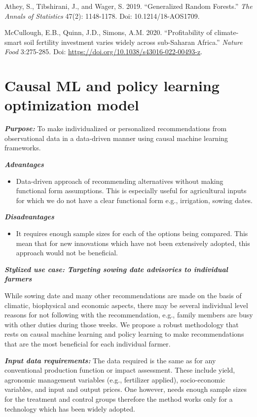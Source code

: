 \documentclass[
  letterpaper,
  DIV=11,
  numbers=noendperiod]{scrreprt}
\providecommand{\tightlist}{%
  \setlength{\itemsep}{0pt}\setlength{\parskip}{0pt}}\usepackage{longtable,booktabs,array}
\begin{document}
Athey, S., Tibshirani, J., and Wager, S. 2019. ``Generalized Random
Forests.'' \emph{The Annals of Statistics} 47(2): 1148-1178. Doi:
10.1214/18-AOS1709.

McCullough, E.B., Quinn, J.D., Simons, A.M. 2020. ``Profitability of
climate-smart soil fertility investment varies widely across sub-Saharan
Africa.'' \emph{Nature Food} 3:275-285. Doi:
\url{https://doi.org/10.1038/s43016-022-00493-z}.

\section{Causal ML and policy learning optimization
model}\label{causal-ml-and-policy-learning-optimization-model}

\textbf{\emph{Purpose:}} To make individualized or personalized
recommendations from observational data in a data-driven manner using
causal machine learning frameworks.

\textbf{\emph{Advantages}}

\begin{itemize}
\tightlist
\item
  Data-driven approach of recommending alternatives without making
  functional form assumptions. This is especially useful for
  agricultural inputs for which we do not have a clear functional form
  e.g., irrigation, sowing dates.
\end{itemize}

\textbf{\emph{Disadvantages}}

\begin{itemize}
\tightlist
\item
  It requires enough sample sizes for each of the options being
  compared. This mean that for new innovations which have not been
  extensively adopted, this approach would not be beneficial.
\end{itemize}

\textbf{\emph{Stylized use case: Targeting sowing date advisories to
individual farmers}}

While sowing date and many other recommendations are made on the basis
of climatic, biophysical and economic aspects, there may be several
individual level reasons for not following with the recommendation,
e.g., family members are busy with other duties during those weeks. We
propose a robust methodology that rests on causal machine learning and
policy learning to make recommendations that are the most beneficial for
each individual farmer.

\textbf{\emph{Input data requirements:}} The data required is the same
as for any conventional production function or impact assessment. These
include yield, agronomic management variables (e.g., fertilizer
applied), socio-economic variables, and input and output prices. One
however, needs enough sample sizes for the treatment and control groups
therefore the method works only for a technology which has been widely
adopted.
\end{document}
